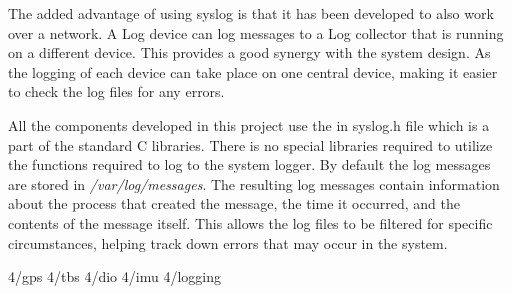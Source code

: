 The added advantage of using syslog is that it has been developed to also work over a network. A Log device can log messages to a Log collector that is running on a different device. This provides a good synergy with the system design. As the logging of each device can take place on one central device, making it easier to check the log files for any errors.

All the components developed in this project use the in syslog.h file which is a part of the standard C libraries. There is no special libraries required to utilize the functions required to log to the system logger. By default the log messages are stored in \emph{/var/log/messages}. The resulting log messages contain information about the process that created the message, the time it occurred, and the contents of the message itself. This allows the log files to be filtered for specific circumstances, helping track down errors that may occur in the system.


 {4/gps}
 {4/tbs}
 {4/dio}
 {4/imu}
 {4/logging}




